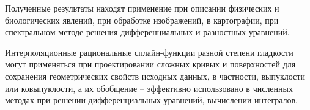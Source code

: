 Полученные результаты находят применение при описании физических и биологических явлений, при обработке изображений, в картографии, при спектральном методе решения дифференциальных и разностных уравнений.

Интерполяционные рациональные сплайн-функции разной степени гладкости могут применяться при проектировании
сложных кривых и поверхностей для сохранения геометрических свойств исходных данных,
в частности, выпуклости или ковыпуклости, а их обобщение -- эффективно использовано в
 численных методах при решении дифференциальных уравнений, вычислении интегралов.




